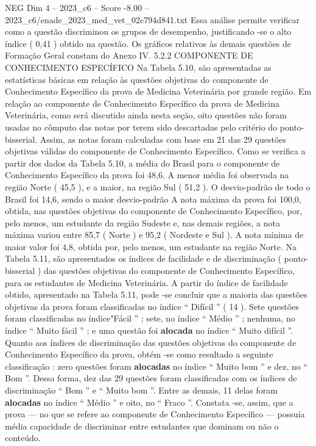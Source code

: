 \begin{textsample}{NEG Dim 4 – 2023\_c6 – Score -8.00 – 2023\_c6/enade\_2023\_med\_vet\_02c794d841.txt}
Essa análise permite verificar como a questão discriminou os grupos de desempenho, justificando -se o alto índice ( 0,41 ) obtido na questão.
Os gráficos relativos às demais questões de Formação Geral constam do Anexo IV. 5.2.2 COMPONENTE DE CONHECIMENTO ESPECÍFICO Na Tabela 5.10, são apresentadas as estatísticas básicas em relação às questões objetivas do componente de Conhecimento Específico da prova de Medicina Veterinária por grande região.
Em relação ao componente de Conhecimento Específico da prova de Medicina Veterinária, como será discutido ainda nesta seção, oito questões não foram usadas no cômputo das notas por terem sido descartadas pelo critério do ponto-bisserial.
Assim, as notas foram calculadas com base em 21 das 29 questões objetivas válidas do componente de Conhecimento Específico.
Como se verifica a partir dos dados da Tabela 5.10, a média do Brasil para o componente de Conhecimento Específico da prova foi 48,6.
A menor média foi observada na região Norte ( 45,5 ), e a maior, na região Sul ( 51,2 ).
O desvio-padrão de todo o Brasil foi 14,6, sendo o maior desvio-padrão A nota máxima da prova foi 100,0, obtida, nas questões objetivas do componente de Conhecimento Específico, por, pelo menos, um estudante da região Sudeste e, nas demais regiões, a nota máxima variou entre 85,7 ( Norte ) e 95,2 ( Nordeste e Sul ).
A nota mínima de maior valor foi 4,8, obtida por, pelo menos, um estudante na região Norte.
Na Tabela 5.11, são apresentados os índices de facilidade e de discriminação ( ponto-bisserial ) das questões objetivas do componente de Conhecimento Específico, para os estudantes de Medicina Veterinária.
A partir do índice de facilidade obtido, apresentado na Tabela 5.11, pode -se concluir que a maioria das questões objetivas da prova foram classificadas no índice “ Difícil ” ( 14 ).
Sete questões foram classificadas no índice"Fácil ” ; sete, no índice “ Médio ” ; nenhuma, no índice “ Muito fácil ” ; e uma questão foi \textbf{alocada} no índice “ Muito difícil ”.
Quanto aos índices de discriminação das questões objetivas do componente de Conhecimento Específico da prova, obtém -se como resultado a seguinte classificação : zero questões foram \textbf{alocadas} no índice “ Muito bom ” e dez, no “ Bom ”.
Dessa forma, dez das 29 questões foram classificadas com os índices de discriminação “ Bom ” e “ Muito bom ”.
Entre as demais, 11 delas foram \textbf{alocadas} no índice “ Médio ” e oito, no “ Fraco ”.
Constata -se, assim, que a prova — no que se refere ao componente de Conhecimento Específico — possuía média capacidade de discriminar entre estudantes que dominam ou não o conteúdo.

\end{textsample}
